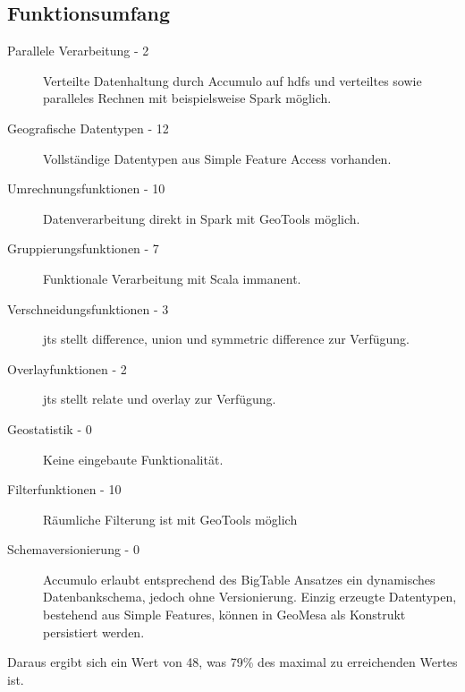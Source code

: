 \subsection{Funktionsumfang}
\begin{description}
\item[Parallele Verarbeitung - 2] Verteilte Datenhaltung durch Accumulo auf \Gls{hdfs} und verteiltes sowie paralleles Rechnen mit beispielsweise Spark möglich. \cite{website:geomesaeclipse}
\item[Geografische Datentypen - 12] Vollständige Datentypen aus Simple Feature Access vorhanden. \cite{website:geomesaeclipse}
\item[Umrechnungsfunktionen - 10] Datenverarbeitung direkt in Spark mit GeoTools möglich. \cite{website:geotools-crs}
\item[Gruppierungsfunktionen - 7] Funktionale Verarbeitung mit Scala immanent.
\item[Verschneidungsfunktionen - 3] \Gls{jts} stellt difference, union und symmetric difference zur Verfügung. \cite{website:jts-wikipedia}
\item[Overlayfunktionen - 2] \Gls{jts} stellt relate und overlay zur Verfügung.
\item[Geostatistik - 0] Keine eingebaute Funktionalität.
\item[Filterfunktionen - 10] Räumliche Filterung ist  mit GeoTools möglich \cite{website:geotools-wiki}
\item[Schemaversionierung - 0] Accumulo erlaubt entsprechend des BigTable Ansatzes ein dynamisches Datenbankschema, jedoch ohne Versionierung. Einzig erzeugte Datentypen, bestehend aus Simple Features, können in GeoMesa als Konstrukt persistiert werden.
\end{description}
Daraus ergibt sich ein Wert von 48, was 79\% des maximal zu erreichenden Wertes ist.

